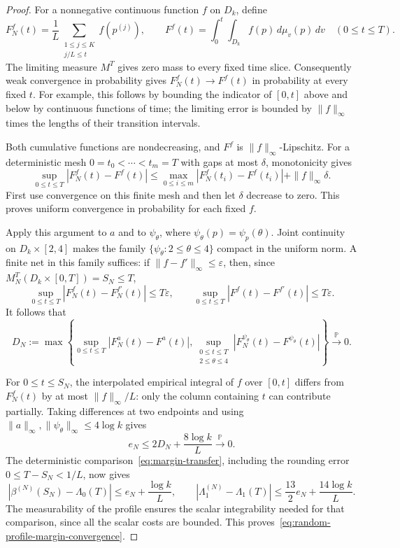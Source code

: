 \begin{proof}
For a nonnegative continuous function $f$ on $D_k$, define
\[
 F_N^f(t)=\frac1L\sum_{\substack{1\le j\le K\\j/L\le t}}f(p^{(j)}),
 \qquad
 F^f(t)=\int_0^t\int_{D_k}f(p)\,d\mu_v(p)\,dv
 \quad(0\le t\le T).
\]
The limiting measure $M^T$ gives zero mass to every fixed time slice.
Consequently weak convergence in probability gives
$F_N^f(t)\to F^f(t)$ in probability at every fixed $t$.
For example, this follows by bounding the indicator of $[0,t]$
above and below by continuous functions of time; the limiting error
is bounded by $\|f\|_\infty$ times the lengths of their transition
intervals.

Both cumulative functions are nondecreasing, and $F^f$ is
$\|f\|_\infty$-Lipschitz. For a deterministic mesh
$0=t_0<\cdots<t_m=T$ with gaps at most $\delta$, monotonicity gives
\[
 \sup_{0\le t\le T}|F_N^f(t)-F^f(t)|
 \le\max_{0\le i\le m}|F_N^f(t_i)-F^f(t_i)|
                         +\|f\|_\infty\delta.
\]
First use convergence on this finite mesh and then let $\delta$
decrease to zero. This proves uniform convergence in probability
for each fixed $f$.

Apply this argument to $a$ and to $\psi_\theta$, where
$\psi_\theta(p)=\psi_p(\theta)$. Joint continuity on
$D_k\times[2,4]$ makes the family $\{\psi_\theta:2\le\theta\le4\}$
compact in the uniform norm. A finite net in this family suffices:
if $\|f-f'\|_\infty\le\varepsilon$, then, since
$M_N^T(D_k\times[0,T])=S_N\le T$,
\[
 \sup_{0\le t\le T}|F_N^f(t)-F_N^{f'}(t)|\le T\varepsilon,
 \qquad
 \sup_{0\le t\le T}|F^f(t)-F^{f'}(t)|\le T\varepsilon.
\]
It follows that
\[
 D_N:=\max\left\{
 \sup_{0\le t\le T}|F_N^a(t)-F^a(t)|,
 \sup_{\substack{0\le t\le T\\2\le\theta\le4}}
       |F_N^{\psi_\theta}(t)-F^{\psi_\theta}(t)|
                    \right\}\xrightarrow{\mathbb P}0.
\]

For $0\le t\le S_N$, the interpolated empirical integral of $f$
over $[0,t]$ differs from $F_N^f(t)$ by at most
$\|f\|_\infty/L$: only the column containing $t$ can contribute
partially. Taking differences at two endpoints and using
$\|a\|_\infty,\|\psi_\theta\|_\infty\le4\log k$ gives
\[
 e_N\le2D_N+\frac{8\log k}{L}
          \xrightarrow{\mathbb P}0.
\]
The deterministic comparison~\eqref{eq:margin-transfer}, including
the rounding error $0\le T-S_N<1/L$, now gives
\[
 |\beta^{(N)}(S_N)-\Lambda_0(T)|
       \le e_N+\frac{\log k}{L},\qquad
 |\Lambda_1^{(N)}-\Lambda_1(T)|
       \le\frac{13}{2}e_N+\frac{14\log k}{L}.
\]
The measurability of the profile ensures the scalar integrability
needed for that comparison, since all the scalar costs are bounded.
This proves~\eqref{eq:random-profile-margin-convergence}.


\end{proof}
